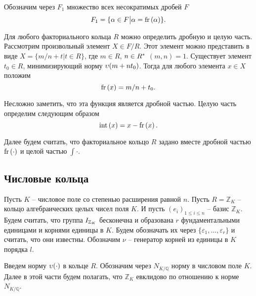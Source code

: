 \documentclass[_00_dissertation.tex]{subfiles}
\begin{document}
\begin{definition}
    Обозначим через $F_1$ множество всех несократимых дробей $F$
    \begin{equation*}
        F_1 = \{
            \alpha \in F \big| \alpha = \textrm{fr}\left(\alpha\right)
        \}.
    \end{equation*}
\end{definition}

\begin{remark}\label{remark:easy_fr}
    Для любого факториального кольца $R$ можно определить дробную и целую часть.
    Рассмотрим произвольный элемент $X \in F/R$.
    Этот элемент можно представить в виде $X = \{m/n + t | t \in R\}$, где $m \in R$, $n \in R^{*}$ $(m, n) = 1$.
    Существует элемент $t_0 \in R$, минимизирующий норму $\upsilon(m + n t_0)$.
    Тогда для любого элемента $x \in X$ положим
    \begin{equation*}
        \textrm{fr}\left(x\right) = m/n + t_0.
    \end{equation*}

    Несложно заметить, что эта функция является дробной частью.
    Целую часть определим следующим образом
    \begin{equation*}
        \textrm{int}\left(x\right) = x - \textrm{fr}\left(x\right).
    \end{equation*}
\end{remark}

Далее будем считать, что факториальное кольцо $R$ задано вместе дробной частью $\textrm{fr}\left(\cdot\right)$ и целой частью $\int{\cdot}$.

\subsection{Числовые кольца}

Пусть $K$ -- числовое поле со степенью расширения равной $n$.
Пусть $R = \mathbb{Z}_K$ -- кольцо алгебраических целых чисел поля $K$.
И пусть $(e_i)_{1 \le i \le n}$ -- базис $\mathbb{Z}_K$.
Будем считать, что группа $I_{\mathbb{Z}_K}$ бесконечна и образована $r$ фундаментальными единицами и корнями единицы в $K$.
Будем обозначать их через $\{\varepsilon_1, \dots, \varepsilon_r\}$ и считать, что они известны.
Обозначим $\nu$ -- генератор корней из единицы в $K$ порядка $l$.

Введем норму $\upsilon(\cdot)$ в кольце $R$.
Обозначим через $N_{K/\mathbb{Q}}$ норму в числовом поле $K$.
Далее в этой части будем полагать, что $\mathbb{Z}_K$ евклидово по отношению к норме $N_{K/\mathbb{Q}}$.
\end{document}
